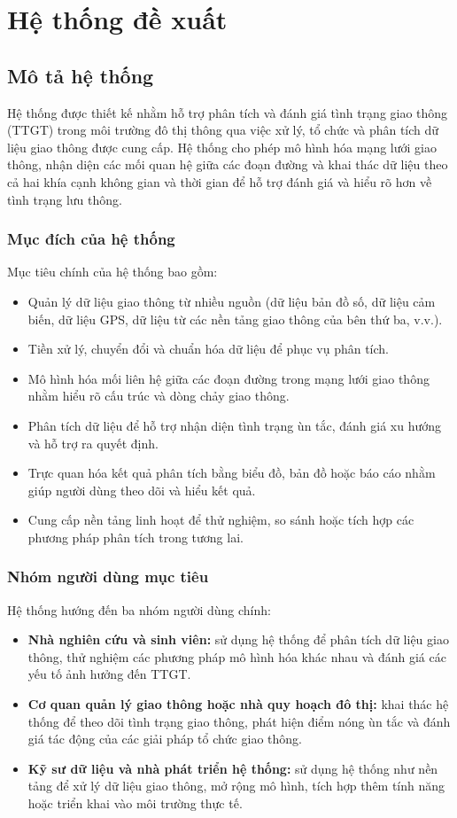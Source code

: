 \section{Hệ thống đề xuất}
\subsection{Mô tả hệ thống}
Hệ thống được thiết kế nhằm hỗ trợ phân tích và đánh giá tình trạng giao thông (TTGT) trong môi trường đô thị thông qua việc xử lý, tổ chức và phân tích dữ liệu giao thông được cung cấp. Hệ thống cho phép mô hình hóa mạng lưới giao thông, nhận diện các mối quan hệ giữa các đoạn đường và khai thác dữ liệu theo cả hai khía cạnh không gian và thời gian để hỗ trợ đánh giá và hiểu rõ hơn về tình trạng lưu thông.

\subsubsection{Mục đích của hệ thống}
Mục tiêu chính của hệ thống bao gồm:
\begin{itemize}
    \item Quản lý dữ liệu giao thông từ nhiều nguồn (dữ liệu bản đồ số, dữ liệu cảm biến, dữ liệu GPS, dữ liệu từ các nền tảng giao thông của bên thứ ba, v.v.).
    \item Tiền xử lý, chuyển đổi và chuẩn hóa dữ liệu để phục vụ phân tích.
    \item Mô hình hóa mối liên hệ giữa các đoạn đường trong mạng lưới giao thông nhằm hiểu rõ cấu trúc và dòng chảy giao thông.
    \item Phân tích dữ liệu để hỗ trợ nhận diện tình trạng ùn tắc, đánh giá xu hướng và hỗ trợ ra quyết định.
    \item Trực quan hóa kết quả phân tích bằng biểu đồ, bản đồ hoặc báo cáo nhằm giúp người dùng theo dõi và hiểu kết quả.
    \item Cung cấp nền tảng linh hoạt để thử nghiệm, so sánh hoặc tích hợp các phương pháp phân tích trong tương lai.
\end{itemize}

\subsubsection{Nhóm người dùng mục tiêu}
Hệ thống hướng đến ba nhóm người dùng chính:
\begin{itemize}
    \item \textbf{Nhà nghiên cứu và sinh viên:} sử dụng hệ thống để phân tích dữ liệu giao thông, thử nghiệm các phương pháp mô hình hóa khác nhau và đánh giá các yếu tố ảnh hưởng đến TTGT.
    \item \textbf{Cơ quan quản lý giao thông hoặc nhà quy hoạch đô thị:} khai thác hệ thống để theo dõi tình trạng giao thông, phát hiện điểm nóng ùn tắc và đánh giá tác động của các giải pháp tổ chức giao thông.
    \item \textbf{Kỹ sư dữ liệu và nhà phát triển hệ thống:} sử dụng hệ thống như nền tảng để xử lý dữ liệu giao thông, mở rộng mô hình, tích hợp thêm tính năng hoặc triển khai vào môi trường thực tế.
\end{itemize}


